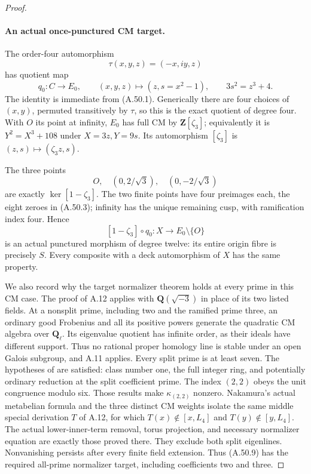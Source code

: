 \begin{proof}
\paragraph{An actual once-punctured CM target.}
The order-four automorphism
\[
               \tau(x,y,z)=(-x,iy,z)
                                                               \tag{A.50.7}
\]
has quotient map
\[
          q_0:C\longrightarrow E_0,
          \qquad (x,y,z)\longmapsto(z,s=x^2-1),
          \qquad 3s^2=z^3+4.                     \tag{A.50.8}
\]
The identity is immediate from (A.50.1). Generically
there are four choices of \((x,y)\), permuted
transitively by \(\tau\), so this is the exact
quotient of degree four. With \(O\) its point at
infinity, \(E_0\) has full CM by
\(\mathbf Z[\zeta_3]\); equivalently it is
\(Y^2=X^3+108\) under \(X=3z,Y=9s\).
Its automorphism \([\zeta_3]\) is
\((z,s)\mapsto(\zeta_3z,s)\).

The three points
\[
          O,\quad (0,2/\sqrt3),\quad(0,-2/\sqrt3)
\]
are exactly \(\ker[1-\zeta_3]\). The two finite
points have four preimages each, the eight zeroes in
(A.50.3); infinity has the unique remaining cusp,
with ramification index four. Hence
\[
      [1-\zeta_3]\circ q_0:X\longrightarrow E_0\setminus\{O\}
                                                               \tag{A.50.9}
\]
is an actual punctured morphism of degree twelve:
its entire origin fibre is precisely \(S\).
Every composite with a deck automorphism of \(X\)
has the same property.

We also record why the target normalizer theorem
holds at every prime in this CM case. The proof of
A.12 applies with \(\mathbf Q(\sqrt{-3})\) in
place of its two listed fields. At a nonsplit prime,
including two and the ramified prime three, an
ordinary good Frobenius and all its positive powers
generate the quadratic CM algebra over
\(\mathbf Q_\ell\). Its eigenvalue quotient has
infinite order, as their ideals have different
support. Thus no rational proper homology line is
stable under an open Galois subgroup, and A.11 applies.
Every split prime is at least seven. The hypotheses
of \cite[Theorem 4.5 and Corollary 4.10]{Ishii2025}
are satisfied: class number one, the full integer
ring, and potentially ordinary reduction at the
split coefficient prime. The index \((2,2)\) obeys
the unit congruence modulo six. Those results make
\(\kappa_{(2,2)}\) nonzero. Nakamura's actual
metabelian formula
\cite[Theorem A and Corollary 4.12]{Nakamura1995}
and the three distinct CM weights isolate the same
middle special derivation \(T\) of A.12, for which
\(T(x)\notin[x,L_4]\) and \(T(y)\notin[y,L_4]\).
The actual lower-inner-term removal, torus projection,
and necessary normalizer equation are exactly those
proved there. They exclude both split eigenlines.
Nonvanishing persists after every finite field
extension. Thus (A.50.9) has the required all-prime
normalizer target, including coefficients two and three.


\end{proof}
